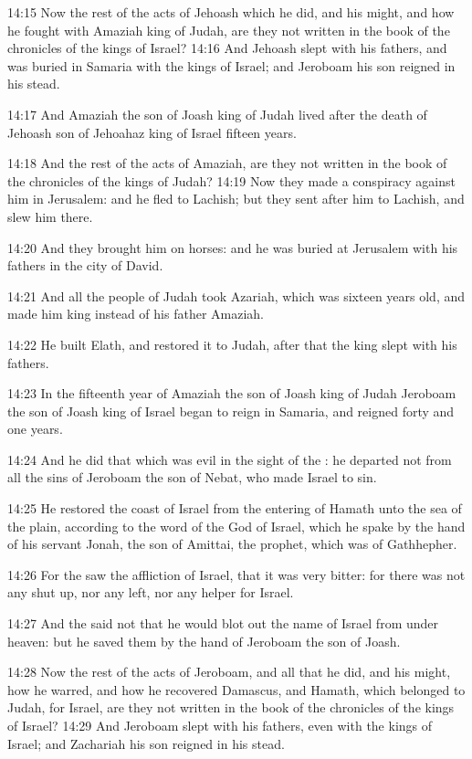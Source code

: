 14:15 Now the rest of the acts of Jehoash which he did, and his might, and how he fought with Amaziah king of Judah, are they not written in the book of the chronicles of the kings of Israel?  14:16 And Jehoash slept with his fathers, and was buried in Samaria with the kings of Israel; and Jeroboam his son reigned in his stead.

14:17 And Amaziah the son of Joash king of Judah lived after the death of Jehoash son of Jehoahaz king of Israel fifteen years.

14:18 And the rest of the acts of Amaziah, are they not written in the book of the chronicles of the kings of Judah?  14:19 Now they made a conspiracy against him in Jerusalem: and he fled to Lachish; but they sent after him to Lachish, and slew him there.

14:20 And they brought him on horses: and he was buried at Jerusalem with his fathers in the city of David.

14:21 And all the people of Judah took Azariah, which was sixteen years old, and made him king instead of his father Amaziah.

14:22 He built Elath, and restored it to Judah, after that the king slept with his fathers.

14:23 In the fifteenth year of Amaziah the son of Joash king of Judah Jeroboam the son of Joash king of Israel began to reign in Samaria, and reigned forty and one years.

14:24 And he did that which was evil in the sight of the \LORD: he departed not from all the sins of Jeroboam the son of Nebat, who made Israel to sin.

14:25 He restored the coast of Israel from the entering of Hamath unto the sea of the plain, according to the word of the \LORD God of Israel, which he spake by the hand of his servant Jonah, the son of Amittai, the prophet, which was of Gathhepher.

14:26 For the \LORD saw the affliction of Israel, that it was very bitter: for there was not any shut up, nor any left, nor any helper for Israel.

14:27 And the \LORD said not that he would blot out the name of Israel from under heaven: but he saved them by the hand of Jeroboam the son of Joash.

14:28 Now the rest of the acts of Jeroboam, and all that he did, and his might, how he warred, and how he recovered Damascus, and Hamath, which belonged to Judah, for Israel, are they not written in the book of the chronicles of the kings of Israel?  14:29 And Jeroboam slept with his fathers, even with the kings of Israel; and Zachariah his son reigned in his stead.

